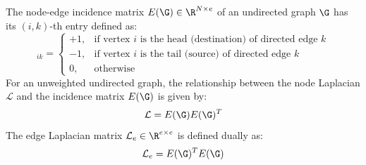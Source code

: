 \begin{definition}\label{def:incidence_matrix}
The node-edge incidence matrix $E(\G) \in \R^{N \times e}$ of an undirected graph $\G$ has its $(i, k)$-th entry defined as:
\begin{equation}
    [E(\G)]_{ik} = \begin{cases}
        +1, & \text{if vertex } i \text{ is the head (destination) of directed edge } k \\
        -1, & \text{if vertex } i \text{ is the tail (source) of directed edge } k \\
        0, & \text{otherwise}
    \end{cases}
\end{equation}
For an unweighted undirected graph, the relationship between the node Laplacian $\mathcal{L}$ and the incidence matrix $E(\G)$ is given by:
\begin{equation}
    \mathcal{L} = E(\G) E(\G)^T
\end{equation}
The edge Laplacian matrix $\mathcal{L}_e \in \R^{e \times e}$ is defined dually as:
\begin{equation}
    \mathcal{L}_e = E(\G)^T E(\G)
\end{equation}
\end{definition}
